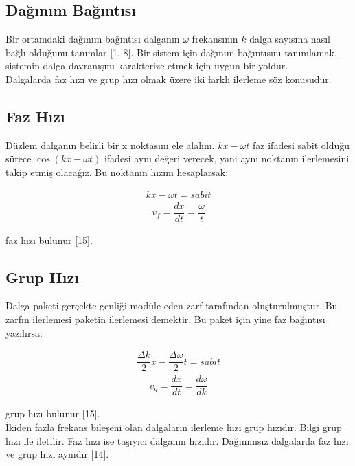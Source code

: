 \documentclass[a4paper,11pt]{article}
\begin{document}
\newpage
	\begin{center}
	\section{Dağınım Bağıntısı}
\end{center}

Bir ortamdaki dağınım bağıntısı dalganın  $\omega$  frekansının  $k$  dalga sayısına nasıl bağlı olduğunu tanımlar [1, 8]. Bir sistem için dağınım bağıntısını tanımlamak,  sistemin dalga davranışını karakterize etmek için uygun bir yoldur. \\

Dalgalarda faz hızı ve grup hızı olmak üzere  iki farklı ilerleme söz konusudur. \\

\subsection{Faz Hızı} Düzlem dalganın belirli bir x noktasını ele alalım. $ kx -\omega t $ faz ifadesi sabit olduğu sürece $\cos(kx -\omega t) $ ifadesi aynı değeri verecek, yani aynı noktanın ilerlemesini takip etmiş olacağız. Bu noktanın hızını hesaplarsak:

\begin{align}
kx -\omega t = sabit
\end{align}
\begin{align}
v_{f} = \dfrac{dx}{dt} = \dfrac{\omega}{t}
\end{align}

faz hızı bulunur  [15]. \\

\subsection{Grup Hızı} Dalga paketi gerçekte genliği modüle eden zarf tarafından oluşturulmuştur. Bu zarfın ilerlemesi paketin ilerlemesi demektir. Bu paket için yine faz bağıntısı yazılırsa:

\begin{align}
\dfrac{\Delta k}{2}x-\dfrac{\Delta \omega}{2}t = sabit
\end{align}
\begin{align}
v_{g} = \dfrac{dx}{dt} = \dfrac{d \omega}{dk}
\end{align}

grup hızı bulunur [15].\\ İkiden fazla frekans bileşeni olan dalgaların ilerleme hızı grup hızıdır. Bilgi grup hızı ile iletilir. Faz hızı ise taşıyıcı dalganın hızıdır. Dağınımsız
dalgalarda faz hızı ve grup hızı aynıdır [14]. 
\end{document}
